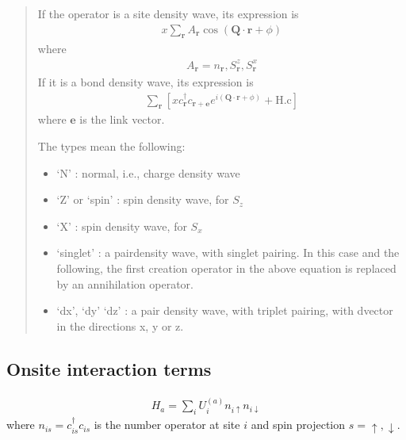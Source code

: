 \documentclass[letterpaper,10pt,english]{sphinxmanual}
\begin{document}
\label{\detokenize{models:density-waves}}\begin{quote}

\sphinxAtStartPar
If the operator is a site density wave, its expression is
\begin{equation*}
\begin{split}x\sum_\mathbf{r} A_\mathbf{r} \cos(\mathbf{Q}\cdot\mathbf{r}+\phi)\end{split}
\end{equation*}
\sphinxAtStartPar
where
\begin{equation*}
\begin{split}A_{\mathbf{r}} = n_{\mathbf{r}}, S^{z}_\mathbf{r}, S^{x}_\mathbf{r}\end{split}
\end{equation*}
\sphinxAtStartPar
If it is a bond density wave, its expression is
\begin{equation*}
\begin{split}\sum_{\mathbf{r}} \left[ x c_\mathbf{r}^\dagger c_{\mathbf{r}+\mathbf{e}} e^{i(\mathbf{Q}\cdot\mathbf{r}+\phi)} + \mathrm{H.c} \right]\end{split}
\end{equation*}
\sphinxAtStartPar
where \(\mathbf{e}\) is the link vector.

\sphinxAtStartPar
The types mean the following:
\begin{itemize}
\item {} 
\sphinxAtStartPar
‘N’ : normal, i.e., charge density wave

\item {} 
\sphinxAtStartPar
‘Z’ or ‘spin’ : spin density wave, for \(S_z\)

\item {} 
\sphinxAtStartPar
‘X’ : spin density wave, for \(S_x\)

\item {} 
\sphinxAtStartPar
‘singlet’ : a pair\sphinxhyphen{}density wave, with singlet pairing. In this case and the following, the first creation operator in the above equation is replaced by an annihilation operator.

\item {} 
\sphinxAtStartPar
‘dx’, ‘dy’ ‘dz’ : a pair density wave, with triplet pairing, with d\sphinxhyphen{}vector in the directions x, y or z.

\end{itemize}
\end{quote}


\subsection{On\sphinxhyphen{}site interaction terms}
\label{\detokenize{models:on-site-interaction-terms}}\begin{equation*}
\begin{split}H_a = \sum_{i} U^{(a)}_i n_{i\uparrow} n_{i\downarrow}\end{split}
\end{equation*}
\sphinxAtStartPar
where \(n_{is}=c^\dagger_{is} c_{is}\) is the number operator at site \(i\) and spin projection \(s=\uparrow,\downarrow\).
\end{document}

